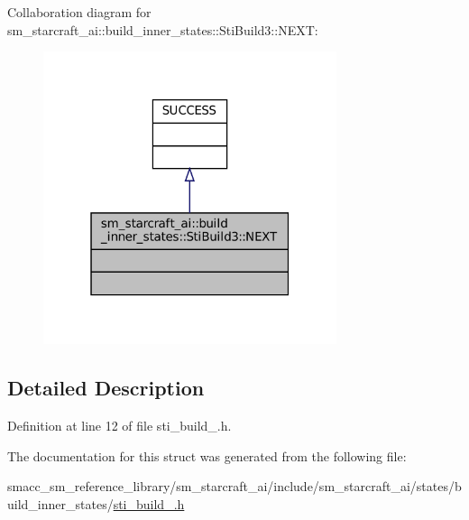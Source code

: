 Collaboration diagram for sm\+\_\+starcraft\+\_\+ai\+:\+:build\+\_\+inner\+\_\+states\+:\+:Sti\+Build3\+:\+:N\+E\+XT\+:
\nopagebreak
\begin{figure}[H]
\begin{center}
\leavevmode
\includegraphics[width=244pt]{structsm__starcraft__ai_1_1build__inner__states_1_1StiBuild3_1_1NEXT__coll__graph}
\end{center}
\end{figure}


\subsection{Detailed Description}


Definition at line 12 of file sti\+\_\+build\+\_.\+h.



The documentation for this struct was generated from the following file\+:\begin{DoxyCompactItemize}
\item 
smacc\+\_\+sm\+\_\+reference\+\_\+library/sm\+\_\+starcraft\+\_\+ai/include/sm\+\_\+starcraft\+\_\+ai/states/build\+\_\+inner\+\_\+states/\hyperlink{sti__build__3_8h}{sti\+\_\+build\+\_.\+h}\end{DoxyCompactItemize}
